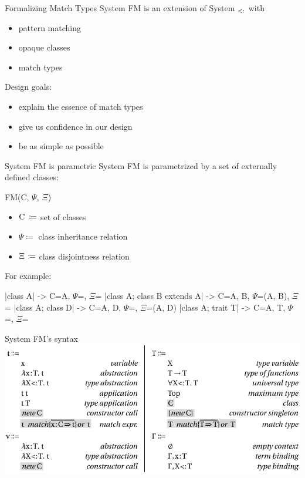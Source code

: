 \documentclass[10pt]{beamer}
\newenvironment{slide}[2][]
  {\begin{frame}[fragile,environment=slide,#1]{#2}}
  {\end{frame}}
\def\C{\normalfont\text{C}}
\def\<:{\allowbreak\operatorname{\normalfont\text{<}:}\allowbreak}
\def\Fsub{\normalfont{F}\ensuremath{_{\<:}}\xspace}
\begin{document}
\begin{slide}{Formalizing Match Types}
System FM is an extension of System \Fsub with
\begin{itemize}
  \item pattern matching
  \item opaque classes
  \item match types
\end{itemize}
Design goals:
\begin{itemize}
  \item explain the essence of match types
  \item give us confidence in our design
  \item be as simple as possible
\end{itemize}
\end{slide}

\begin{slide}{System FM is parametric}
System FM is parametrized by a set of externally defined classes:

FM(C, $\Psi$, $\Xi$)
\begin{itemize}
  \item $\C \hspace{2.3pt} \coloneqq$ set of classes
  \item $\Psi \coloneqq$ class inheritance relation
  \item $\Xi \hspace{1.1pt} \coloneqq$ class disjointness relation
\end{itemize}

For example:

|class A|                    -> C={A}, $\Psi$={}, $\Xi$={}
|class A; class B extends A| -> C={A, B}, $\Psi$={(A, B)}, $\Xi$={}
|class A; class D|           -> C={A, D}, $\Psi$={}, $\Xi$={(A, D)}
|class A; trait T|           -> C={A, T}, $\Psi$={}, $\Xi$={}
\end{slide}

\begin{slide}{System FM's syntax}
\includegraphics[width=\textwidth]{figures/FMSyntax.pdf}
\end{slide}
\end{document}
